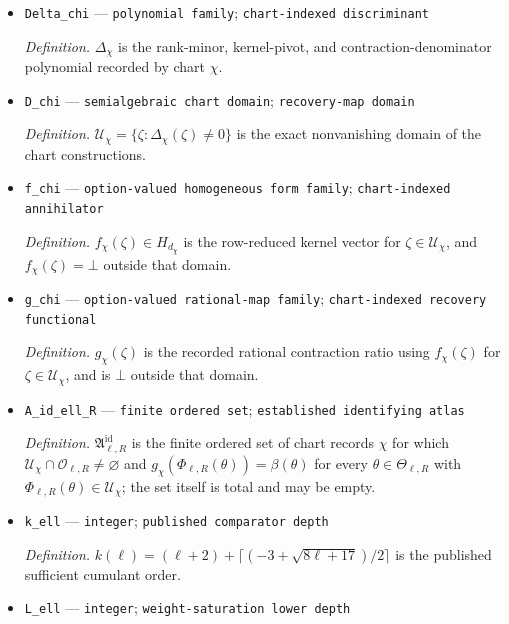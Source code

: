 \documentclass{article}
\begin{document}
\begin{itemize}
  \item \texttt{Delta\_\allowbreak{}chi} --- \texttt{polynomial family}; \texttt{chart-\allowbreak{}indexed discriminant}
  \par\smallskip\noindent\emph{Definition.} \(\Delta_{\chi}\) is the rank-minor, kernel-pivot, and contraction-denominator polynomial recorded by chart \(\chi\).
  \item \texttt{D\_\allowbreak{}chi} --- \texttt{semialgebraic chart domain}; \texttt{recovery-\allowbreak{}map domain}
  \par\smallskip\noindent\emph{Definition.} \(\mathcal U_{\chi}=\{\zeta:\Delta_{\chi}(\zeta)\ne0\}\) is the exact nonvanishing domain of the chart constructions.
  \item \texttt{f\_\allowbreak{}chi} --- \texttt{option-\allowbreak{}valued homogeneous form family}; \texttt{chart-\allowbreak{}indexed annihilator}
  \par\smallskip\noindent\emph{Definition.} \(f_{\chi}(\zeta)\in H_{d_{\chi}}\) is the row-reduced kernel vector for \(\zeta\in\mathcal U_{\chi}\), and \(f_{\chi}(\zeta)=\bot\) outside that domain.
  \item \texttt{g\_\allowbreak{}chi} --- \texttt{option-\allowbreak{}valued rational-\allowbreak{}map family}; \texttt{chart-\allowbreak{}indexed recovery functional}
  \par\smallskip\noindent\emph{Definition.} \(g_{\chi}(\zeta)\) is the recorded rational contraction ratio using \(f_{\chi}(\zeta)\) for \(\zeta\in\mathcal U_{\chi}\), and is \(\bot\) outside that domain.
  \item \texttt{A\_\allowbreak{}id\_\allowbreak{}ell\_\allowbreak{}R} --- \texttt{finite ordered set}; \texttt{established identifying atlas}
  \par\smallskip\noindent\emph{Definition.} \(\mathfrak A^{\mathrm{id}}_{\ell,R}\) is the finite ordered set of chart records \(\chi\) for which \(\mathcal U_{\chi}\cap\mathcal O_{\ell,R}\ne\varnothing\) and \(g_{\chi}(\Phi_{\ell,R}(\theta))=\beta(\theta)\) for every \(\theta\in\Theta_{\ell,R}\) with \(\Phi_{\ell,R}(\theta)\in\mathcal U_{\chi}\); the set itself is total and may be empty.
  \item \texttt{k\_\allowbreak{}ell} --- \texttt{integer}; \texttt{published comparator depth}
  \par\smallskip\noindent\emph{Definition.} \(k(\ell)=(\ell+2)+\lceil(-3+\sqrt{8\ell+17})/2\rceil\) is the published sufficient cumulant order.
  \item \texttt{L\_\allowbreak{}ell} --- \texttt{integer}; \texttt{weight-\allowbreak{}saturation lower depth}

\end{itemize}
\end{document}
